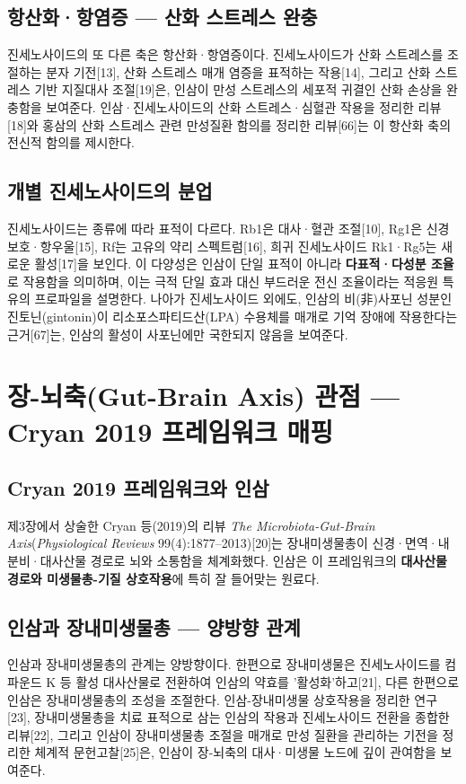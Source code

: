 \documentclass[11pt,oneside]{book}
\begin{document}
\subsection{항산화·항염증 — 산화 스트레스 완충}
진세노사이드의 또 다른 축은 항산화·항염증이다. 진세노사이드가 산화 스트레스를 조절하는 분자 기전[13], 산화 스트레스 매개 염증을 표적하는 작용[14], 그리고 산화 스트레스 기반 지질대사 조절[19]은, 인삼이 만성 스트레스의 세포적 귀결인 산화 손상을 완충함을 보여준다. 인삼·진세노사이드의 산화 스트레스·심혈관 작용을 정리한 리뷰[18]와 홍삼의 산화 스트레스 관련 만성질환 함의를 정리한 리뷰[66]는 이 항산화 축의 전신적 함의를 제시한다.

\subsection{개별 진세노사이드의 분업}
진세노사이드는 종류에 따라 표적이 다르다. Rb1은 대사·혈관 조절[10], Rg1은 신경보호·항우울[15], Rf는 고유의 약리 스펙트럼[16], 희귀 진세노사이드 Rk1·Rg5는 새로운 활성[17]을 보인다. 이 다양성은 인삼이 단일 표적이 아니라 \textbf{다표적·다성분 조율}로 작용함을 의미하며, 이는 극적 단일 효과 대신 부드러운 전신 조율이라는 적응원 특유의 프로파일을 설명한다. 나아가 진세노사이드 외에도, 인삼의 비(非)사포닌 성분인 진토닌(gintonin)이 리소포스파티드산(LPA) 수용체를 매개로 기억 장애에 작용한다는 근거[67]는, 인삼의 활성이 사포닌에만 국한되지 않음을 보여준다.

\section{장-뇌축(Gut-Brain Axis) 관점 — Cryan 2019 프레임워크 매핑}
\subsection{Cryan 2019 프레임워크와 인삼}
제3장에서 상술한 Cryan 등(2019)의 리뷰 \textit{The Microbiota-Gut-Brain Axis}(\textit{Physiological Reviews} 99(4):1877–2013)[20]는 장내미생물총이 신경·면역·내분비·대사산물 경로로 뇌와 소통함을 체계화했다. 인삼은 이 프레임워크의 \textbf{대사산물 경로와 미생물총-기질 상호작용}에 특히 잘 들어맞는 원료다.

\subsection{인삼과 장내미생물총 — 양방향 관계}
인삼과 장내미생물총의 관계는 양방향이다. 한편으로 장내미생물은 진세노사이드를 컴파운드 K 등 활성 대사산물로 전환하여 인삼의 약효를 '활성화'하고[21], 다른 한편으로 인삼은 장내미생물총의 조성을 조절한다. 인삼-장내미생물 상호작용을 정리한 연구[23], 장내미생물총을 치료 표적으로 삼는 인삼의 작용과 진세노사이드 전환을 종합한 리뷰[22], 그리고 인삼이 장내미생물총 조절을 매개로 만성 질환을 관리하는 기전을 정리한 체계적 문헌고찰[25]은, 인삼이 장-뇌축의 대사·미생물 노드에 깊이 관여함을 보여준다.
\end{document}

